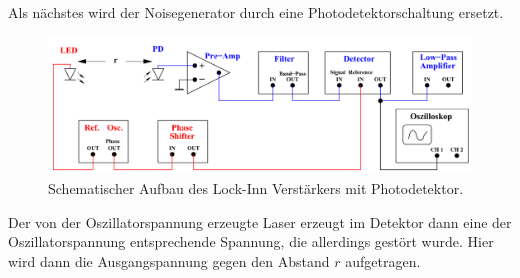 Als nächstes wird der Noisegenerator durch eine Photodetektorschaltung ersetzt.
\begin{figure}[H]
    \centering
    \includegraphics{Bilder/PhotoLockInn}
    \caption{Schematischer Aufbau des Lock-Inn Verstärkers mit Photodetektor.}
    \label{fig:photo}
\end{figure}
Der von der Oszillatorspannung erzeugte Laser erzeugt im Detektor dann eine der Oszillatorspannung entsprechende Spannung, die 
allerdings gestört wurde. Hier wird dann die Ausgangspannung gegen den Abstand $r$ aufgetragen.

\label{sec:Durchführung}
